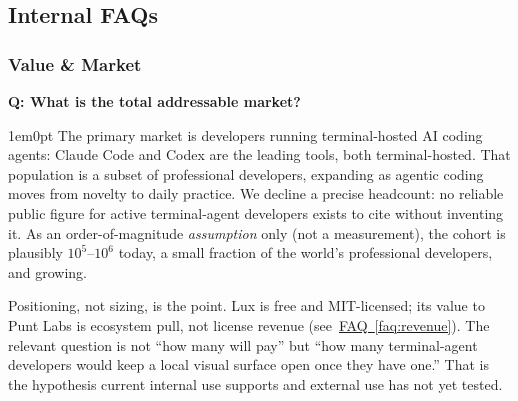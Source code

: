 \documentclass[11pt,letterpaper]{article}
\newcounter{faqnum}
\newenvironment{faqpair}[1]{%
  \needspace{4\baselineskip}%
  \vspace{0.5em}%
  \refstepcounter{faqnum}%
  \noindent\textbf{\color{SectionBlue}Q\thefaqnum: #1}\par\nopagebreak[4]%
  \vspace{0.2em}%
  \begin{adjustwidth}{1em}{0pt}%
  \setlength{\parindent}{0pt}%
}{%
  \end{adjustwidth}%
  \vspace{0.5em}%
}
\newcommand{\faqref}[1]{\hyperref[#1]{FAQ~\ref*{#1}}}
\begin{document}
\newpage
\subsection*{Internal FAQs}

\subsubsection*{Value \& Market}

\begin{faqpair}{What is the total addressable market?}\label{faq:tam}
  The primary market is developers running terminal-hosted AI coding agents:
  Claude Code\cite{anthropic2025claudecode} and Codex are the leading tools,
  both terminal-hosted. That population is a subset of professional developers,
  expanding as agentic coding moves from novelty to daily practice. We decline
  a precise headcount: no reliable public figure for active terminal-agent
  developers exists to cite without inventing it. As an order-of-magnitude
  \emph{assumption} only (not a measurement), the cohort is plausibly
  $10^5$--$10^6$ today, a small fraction of the world's professional
  developers, and growing.

  Positioning, not sizing, is the point. Lux is free and MIT-licensed; its value
  to Punt Labs is ecosystem pull, not license revenue (see~\faqref{faq:revenue}).
  The relevant question is not ``how many will pay'' but ``how many terminal-agent
  developers would keep a local visual surface open once they have one.'' That is
  the hypothesis current internal use supports and external use has not yet
  tested.
\end{faqpair}
\end{document}
